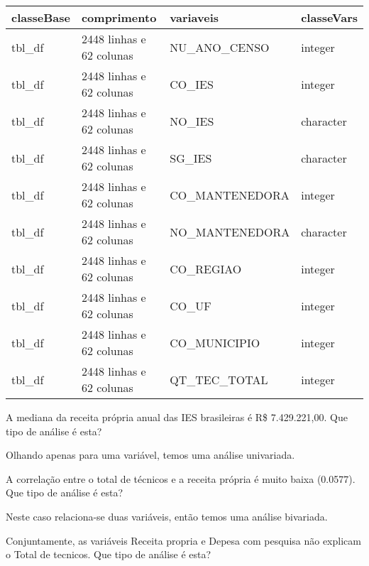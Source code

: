 \documentclass[12pt,]{style/krantz}
\theoremstyle{definition}
\theoremstyle{definition}
\theoremstyle{definition}
\theoremstyle{remark}
\let\BeginKnitrBlock\begin \let\EndKnitrBlock\end
\begin{document}
\begin{table}[!h]
\centering
\begin{tabular}{llll}
\toprule
classeBase & comprimento & variaveis & classeVars\\
\midrule
tbl\_df & 2448 linhas e 62 colunas & NU\_ANO\_CENSO & integer\\
tbl\_df & 2448 linhas e 62 colunas & CO\_IES & integer\\
tbl\_df & 2448 linhas e 62 colunas & NO\_IES & character\\
tbl\_df & 2448 linhas e 62 colunas & SG\_IES & character\\
tbl\_df & 2448 linhas e 62 colunas & CO\_MANTENEDORA & integer\\
\addlinespace
tbl\_df & 2448 linhas e 62 colunas & NO\_MANTENEDORA & character\\
tbl\_df & 2448 linhas e 62 colunas & CO\_REGIAO & integer\\
tbl\_df & 2448 linhas e 62 colunas & CO\_UF & integer\\
tbl\_df & 2448 linhas e 62 colunas & CO\_MUNICIPIO & integer\\
tbl\_df & 2448 linhas e 62 colunas & QT\_TEC\_TOTAL & integer\\
\bottomrule
\end{tabular}
\end{table}

\BeginKnitrBlock{exercise}
\protect\hypertarget{exr:unnamed-chunk-25}{}{\label{exr:unnamed-chunk-25} }A mediana da receita própria anual das IES brasileiras é R\$ 7.429.221,00. Que tipo de análise é esta?
\EndKnitrBlock{exercise}

\BeginKnitrBlock{solution}
\iffalse{} {Solução. } \fi{}Olhando apenas para uma variável, temos uma análise univariada.
\EndKnitrBlock{solution}

\BeginKnitrBlock{exercise}
\protect\hypertarget{exr:unnamed-chunk-27}{}{\label{exr:unnamed-chunk-27} }A correlação entre o total de técnicos e a receita própria é muito baixa (0.0577). Que tipo de análise é esta?
\EndKnitrBlock{exercise}

\BeginKnitrBlock{solution}
\iffalse{} {Solução. } \fi{}Neste caso relaciona-se duas variáveis, então temos uma análise bivariada.
\EndKnitrBlock{solution}

\BeginKnitrBlock{exercise}
\protect\hypertarget{exr:unnamed-chunk-29}{}{\label{exr:unnamed-chunk-29} }Conjuntamente, as variáveis Receita propria e Depesa com pesquisa não explicam o Total de tecnicos. Que tipo de análise é esta?
\EndKnitrBlock{exercise}
\end{document}
